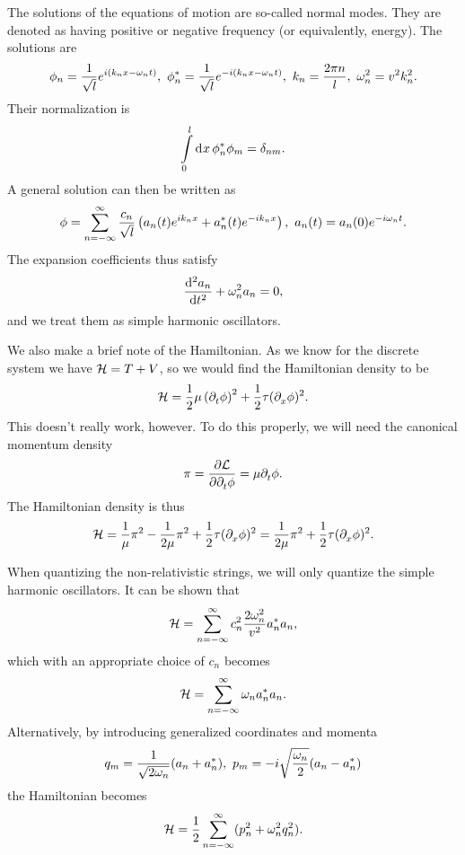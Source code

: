 The solutions of the equations of motion are so-called normal modes. They are denoted as having positive or negative frequency (or equivalently, energy). The solutions are
\begin{align*}
	\phi_{n} = \frac{1}{\sqrt{l}}e^{i(k_{n}x - \omega_{n}t)},\ \cc{\phi_{n}} = \frac{1}{\sqrt{l}}e^{-i(k_{n}x - \omega_{n}t)},\ k_{n} = \frac{2\pi n}{l},\ \omega_{n}^{2} = v^{2}k_{n}^{2}.
\end{align*}
Their normalization is
\begin{align*}
	\int\limits_{0}^{l}\dd[]{x}\phi_{n}^{*}\phi_m = \delta_{nm}.
\end{align*}
A general solution can then be written as
\begin{align*}
	\phi = \sum\limits_{n = -\infty}^{\infty}\frac{c_{n}}{\sqrt{l}}\left(a_{n}(t)e^{ik_{n}x} + a_{n}^{*}(t)e^{-ik_{n}x}\right),\ a_{n}(t) = a_{n}(0)e^{-i\omega_{n}t}.
\end{align*}
The expansion coefficients thus satisfy
\begin{align*}
	\dv[2]{a_{n}}{t} + \omega_{n}^{2}a_{n} = 0,
\end{align*}
and we treat them as simple harmonic oscillators.

We also make a brief note of the Hamiltonian. As we know for the discrete system we have $\mathcal{H} = T + V$, so we would find the Hamiltonian density to be
\begin{align*}
	\mathcal{H} = \frac{1}{2}\mu\left(\partial^{}_{t}\phi\right)^{2} + \frac{1}{2}\tau(\partial^{}_{x}\phi)^{2}.
\end{align*}
This doesn't really work, however. To do this properly, we will need the canonical momentum density
\begin{align*}
	\pi = \pdv{\ensuremath{\mathcal{L}}}{\partial^{}_{t}\phi} = \mu\partial^{}_{t}\phi.
\end{align*}
The Hamiltonian density is thus
\begin{align*}
	\mathcal{H} = \frac{1}{\mu}\pi^{2} - \frac{1}{2\mu}\pi^{2} + \frac{1}{2}\tau(\partial^{}_{x}\phi)^{2} = \frac{1}{2\mu}\pi^{2} + \frac{1}{2}\tau(\partial^{}_{x}\phi)^{2}.
\end{align*}

When quantizing the non-relativistic strings, we will only quantize the simple harmonic oscillators. It can be shown that
\begin{align*}
	\mathcal{H} = \sum\limits_{n = -\infty}^{\infty}c_{n}^{2}\frac{2\omega_{n}^{2}}{v^{2}}a^{*}_{n}a_{n},
\end{align*}
which with an appropriate choice of $c_{n}$ becomes
\begin{align*}
	\mathcal{H} = \sum\limits_{n = -\infty}^{\infty}\omega_{n}a^{*}_{n}a_{n}.
\end{align*}
Alternatively, by introducing generalized coordinates and momenta
\begin{align*}
	q_{m} = \frac{1}{\sqrt{2\omega_{n}}}(a_{n} + a^{*}_{n}),\ p_{m} = -i\sqrt{\frac{\omega_{n}}{2}}(a_{n} - a^{*}_{n})
\end{align*}
the Hamiltonian becomes
\begin{align*}
	\mathcal{H} = \frac{1}{2}\sum\limits_{n = -\infty}^{\infty}(p_{n}^{2} + \omega_{n}^{2}q_{n}^{2}).
\end{align*}

